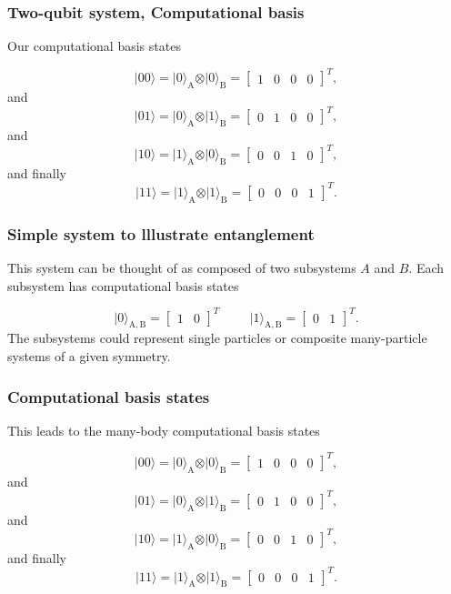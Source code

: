 \documentclass{beamer}
\begin{document}
\begin{frame}
\frametitle{Two-qubit system, Computational basis}

Our computational basis states

\[
\vert 00\rangle = \vert 0\rangle_{\mathrm{A}}\otimes \vert 0\rangle_{\mathrm{B}}=\begin{bmatrix} 1 & 0 & 0 &0\end{bmatrix}^T,
\]
and
\[
\vert 01\rangle = \vert 0\rangle_{\mathrm{A}}\otimes \vert 1\rangle_{\mathrm{B}}=\begin{bmatrix} 0 & 1 & 0 &0\end{bmatrix}^T,
\]
and
\[
\vert 10\rangle = \vert 1\rangle_{\mathrm{A}}\otimes \vert 0\rangle_{\mathrm{B}}=\begin{bmatrix} 0 & 0 & 1 &0\end{bmatrix}^T,
\]
and finally
\[
\vert 11\rangle = \vert 1\rangle_{\mathrm{A}}\otimes \vert 1\rangle_{\mathrm{B}}=\begin{bmatrix} 0 & 0 & 0 &1\end{bmatrix}^T.
\]
\end{frame}

\begin{frame}
\frametitle{Simple system to lllustrate entanglement}

This system can be thought of as composed of two subsystems
$A$ and $B$. Each subsystem has computational basis states

\[
\vert 0\rangle_{\mathrm{A,B}}=\begin{bmatrix} 1 & 0\end{bmatrix}^T \hspace{1cm} \vert 1\rangle_{\mathrm{A,B}}=\begin{bmatrix} 0 & 1\end{bmatrix}^T.
\]
The subsystems could represent single particles or composite many-particle systems of a given symmetry.
\end{frame}

\begin{frame}
\frametitle{Computational basis states}

This leads to the many-body computational basis states

\[
\vert 00\rangle = \vert 0\rangle_{\mathrm{A}}\otimes \vert 0\rangle_{\mathrm{B}}=\begin{bmatrix} 1 & 0 & 0 &0\end{bmatrix}^T,
\]
and
\[
\vert 01\rangle = \vert 0\rangle_{\mathrm{A}}\otimes \vert 1\rangle_{\mathrm{B}}=\begin{bmatrix} 0 & 1 & 0 &0\end{bmatrix}^T,
\]
and
\[
\vert 10\rangle = \vert 1\rangle_{\mathrm{A}}\otimes \vert 0\rangle_{\mathrm{B}}=\begin{bmatrix} 0 & 0 & 1 &0\end{bmatrix}^T,
\]
and finally
\[
\vert 11\rangle = \vert 1\rangle_{\mathrm{A}}\otimes \vert 1\rangle_{\mathrm{B}}=\begin{bmatrix} 0 & 0 & 0 &1\end{bmatrix}^T.
\]
\end{frame}
\end{document}

